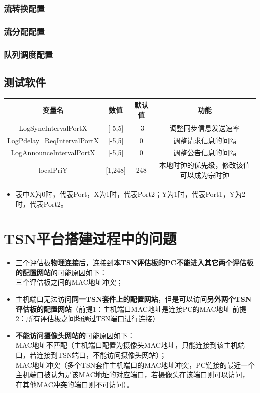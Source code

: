 \subsection{流转换配置}

\subsection{流分配配置}

\subsection{队列调度配置}

\section{测试软件}

\begin{tabular}{cccc}
		\toprule[1.5pt] %
		变量名 & 数值 & 默认值 & 功能\\
		\midrule
		LogSyncIntervalPortX & [-5,5]& -3 & 调整同步信息发送速率\\
		LogPdelay\_ReqIntervalPortX & [-5,5] & 0 & 调整请求信息的间隔\\
		LogAnnounceIntervalPortX & [-5,5] & 0 & 调整公告信息的间隔\\
		localPriY & [1,248] & 248 & 本地时钟的优先级，修改该值可以成为宗时钟\\
		\bottomrule[1.5pt]
\end{tabular}

\begin{itemize}
	\item 表中X为0时，代表Port，X为1时，代表Port2；Y为1时，代表Port1，Y为2时，代表Port2。\\
\end{itemize}
	
\chapter{TSN平台搭建过程中的问题}

\begin{itemize}
    \item 三个评估板\textbf{物理连接}后，连接到\textbf{本TSN评估板的PC不能进入其它两个评估板的配置网站}的可能原因如下：\\
    三个评估板之间的MAC地址冲突；
    \item 主机端口无法访问\textbf{同一TSN套件上的配置网站}，但是可以访问\textbf{另外两个TSN评估板的配置网站}（前提1：主机端口MAC地址是连接PC的MAC地址 前提2：所有评估板之间均通过TSN端口进行连接）
    \item \textbf{不能访问摄像头网站的}可能原因如下：\\
    MAC地址不匹配（主机端口配置为摄像头MAC地址，只能连接到该主机端口，若连接到TSN端口，不能访问摄像头网站）；\\
    MAC地址冲突（多个TSN套件主机端口的MAC地址冲突，PC链接的最近一个主机端口被认为是该MAC地址的对应端口，若摄像头在该端口则可以访问，在其他MAC冲突的端口则不可访问）。
\end{itemize}

